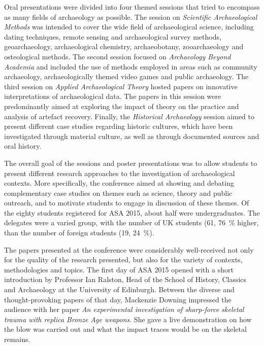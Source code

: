 	Oral presentations were divided into four themed sessions that tried to encompass as many fields of archaeology as possible. The session on \emph{Scientific Archaeological Methods} was intended to cover the wide field of archaeological science, including dating techniques, remote sensing and archaeological survey methods, geoarchaeology, archaeological chemistry, archaeobotany, zooarchaeology and osteological methods. The second session focused on \emph{Archaeology Beyond Academia} and included the use of methods employed in areas such as community archaeology, archaeologically themed video games and public archaeology. The third session on \textit{Applied Archaeological Theory} hosted papers on innovative interpretations of archaeological data. The papers in this session were predominantly aimed at exploring the impact of theory on the practice 
and analysis of artefact recovery. Finally, the \emph{Historical Archaeology} session aimed to present different case studies regarding historic cultures, which have been investigated through material culture, as well as through documented sources and oral history.
	
	The overall goal of the sessions and poster presentations was to allow students to present different research approaches to the investigation of archaeological contexts. More specifically, the conference aimed at showing and debating complementary case studies on themes such as science, theory and public outreach, and to motivate students to engage in discussion of these themes. Of the eighty students registered for ASA 2015, about half were undergraduates. The delegates were a varied group, with the number of UK students (61, \SI{76}{\percent} higher, than the number of foreign students (19, \SI{24}{\percent}).
	
	The papers presented at the conference were considerably well-received not only for the quality of the research presented, but also for the variety of contexts, methodologies and topics. The first day of ASA 2015 opened with a short introduction by Professor Ian Ralston, Head of the School of History, Classics and Archaeology at the University of Edinburgh. Between the diverse and thought-provoking papers of that day, Mackenzie Downing impressed the audience with her paper \textit{An experimental investigation of sharp-force skeletal trauma with replica Bronze Age weapons}. She gave a live demonstration on how the blow was carried out and what the impact traces would be on the skeletal remains.
	
